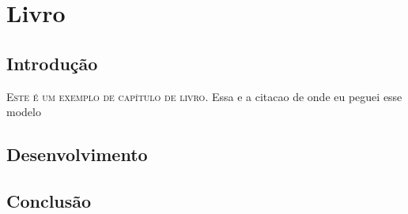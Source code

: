 \chapter{Livro}

\section{Introdução}

\lettrine{E}{ste é um exemplo de capítulo de livro}.  Essa e a citacao de onde eu peguei esse modelo \cite{carauma}

\lipsum[1-10]

\section{Desenvolvimento}

\lipsum[11-20]

\section{Conclusão}

\lipsum[21-30]



